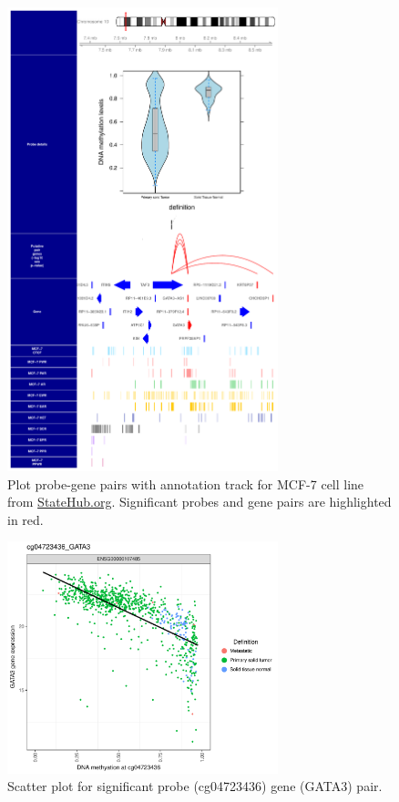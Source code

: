 \begin{figure}
\centering
\includegraphics[width=0.7\textwidth]{images/cg04723436_schematic_byProbe.pdf}
\caption[Schematic plot gene-probe pairs]{\label{fig:pairplot} Plot probe-gene pairs with annotation track for MCF-7 cell line from \url{StateHub.org}. Significant probes and gene pairs are highlighted in red.}
\end{figure}




\begin{figure}
\centering
\includegraphics[width=0.7\textwidth]{images/cg04723436_GATA3_bypair.pdf}
\caption{\label{fig:scatterplot} Scatter plot for significant probe (cg04723436) gene (GATA3) pair.}
\end{figure}

